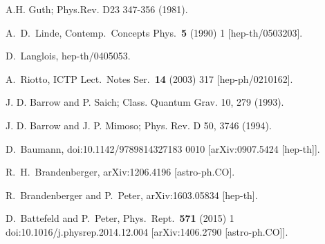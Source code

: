 \documentclass{article}
\begin{document}
\begin{thebibliography}{99}
A.H. Guth;  Phys.Rev. D23 347-356 (1981).

  A.~D.~Linde,
  Contemp.\ Concepts Phys.\  {\bf 5} (1990) 1
  [hep-th/0503203].
  
  
  





  D.~Langlois,
  hep-th/0405053.


  A.~Riotto,
  ICTP Lect.\ Notes Ser.\  {\bf 14} (2003) 317
  [hep-ph/0210162].


J. D. Barrow and P. Saich; Class. Quantum Grav. 10, 279 (1993).

J. D. Barrow and J. P. Mimoso; Phys. Rev. D 50, 3746 (1994).



D.~Baumann,
doi:10.1142/9789814327183 0010
[arXiv:0907.5424 [hep-th]].


R.~H.~Brandenberger,
arXiv:1206.4196 [astro-ph.CO].




R.~Brandenberger and P.~Peter,
arXiv:1603.05834 [hep-th].


 D.~Battefeld and P.~Peter,
 Phys.\ Rept.\ {\bf 571} (2015) 1
 doi:10.1016/j.physrep.2014.12.004
 [arXiv:1406.2790 [astro-ph.CO]].



\end{thebibliography}
\end{document}
